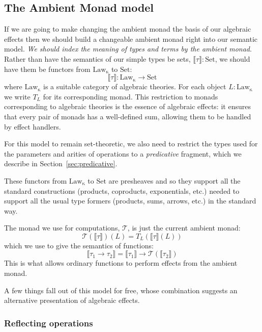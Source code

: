 \documentclass[acmsmall, screen, review, anonymous]{acmart}
\theoremstyle{definition}
\newcommand{\arr}{\rightarrow}
\newcommand{\setc}{\mathrm{Set}}
\newcommand{\lawc}{\mathrm{Law_{\kappa}}}
\newcommand{\sem}[1]{\llbracket #1 \rrbracket}
\newcommand{\mon}{\mathcal{T}}
\newcommand{\types}{\mathrel{:}}
\begin{document}
\subsection{The Ambient Monad model}

If we are going to make changing the ambient monad the basis of our
algebraic effects then we should build a changeable ambient monad right
into our semantic model. \emph{We should index the meaning of types and
  terms by the ambient monad}. Rather than have the semantics of our
simple types be sets, $\sem{\tau} \types \setc$, we should have them be
functors from $\lawc$ to $\setc$:
\begin{equation*}
\sem{\tau} \types \lawc \arr \setc
\end{equation*}
where $\lawc$ is a suitable category of algebraic theories. For each
object $L \types \lawc$ we write $T_L$ for its corresponding monad. This
restriction to monads corresponding to algebraic theories is the essence
of algebraic effects: it ensures that every pair of monads has a
well-defined sum, allowing them to be handled by effect handlers.

For this model to remain set-theoretic, we also need to restrict the
types used for the parameters and arities of operations to a
\emph{predicative} fragment, which we describe in
Section~\ref{sec:predicative}.

These functors from $\lawc$ to $\setc$ are presheaves and so they
support all the standard constructions (products, coproducts,
exponentials, etc.) needed to support all the usual type formers
(products, sums, arrows, etc.) in the standard way.

The monad we use for computations, $\mon$, is just the current ambient
monad:
\begin{equation*}
  \mon(\sem{\tau})(L) = T_L(\sem{\tau}(L))
\end{equation*}
which we use to give the semantics of functions:
\begin{equation*}
  \sem{\tau_1 \arr \tau_2} = \sem{\tau_1} \arr \mon(\sem{\tau_2})
\end{equation*}
This is what allows ordinary functions to perform effects from the
ambient monad.

A few things fall out of this model for free, whose combination suggests
an alternative presentation of algebraic effects.

\subsubsection{Reflecting operations}
\end{document}
